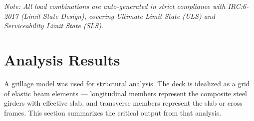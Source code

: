 \documentclass[12pt,a4paper]{report}
\numberwithin{table}{chapter}
\numberwithin{figure}{chapter}
\renewcommand{\arraystretch}{1.20}
\begin{document}
\noindent\textit{\footnotesize Note: All load combinations are auto-generated in strict compliance with IRC:6-2017 (Limit State Design), covering Ultimate Limit State (ULS) and Serviceability Limit State (SLS).}


\chapter{Analysis Results}

A grillage model was used for structural analysis. The deck is idealized as a grid of elastic beam elements --- longitudinal members represent the composite steel girders with effective slab, and transverse members represent the slab or cross frames. This section summarizes the critical output from that analysis.

\vspace{1em}
\begingroup
\footnotesize
\setlength{\tabcolsep}{3pt}
\renewcommand{\arraystretch}{1.25}
\end{document}
